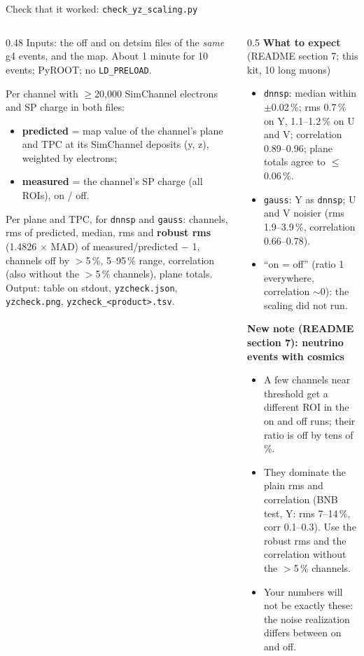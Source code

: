 \documentclass[aspectratio=169,10pt]{beamer}
\newcommand{\code}[1]{\texttt{#1}}
\begin{document}
\begin{frame}{Check that it worked: \code{check\_yz\_scaling.py}}
\footnotesize
\begin{columns}[T]
\begin{column}{0.48\textwidth}
Inputs: the off and on detsim files of the \emph{same} g4 events, and the map. About 1 minute for 10 events; PyROOT; no \code{LD\_PRELOAD}.
\vspace{1mm}

Per channel with $\ge$20,000 SimChannel electrons and SP charge in both files:
\begin{itemize}
\item \textbf{predicted} = map value of the channel's plane and TPC at its SimChannel deposits (y, z), weighted by electrons;
\item \textbf{measured} = the channel's SP charge (all ROIs), on / off.
\end{itemize}
Per plane and TPC, for \code{dnnsp} and \code{gauss}: channels, rms of predicted, median, rms and \textbf{robust rms} (1.4826 $\times$ MAD) of measured/predicted $-$ 1, channels off by $>$5\,\%, 5--95\,\% range, correlation (also without the $>$5\,\% channels), plane totals.
Output: table on stdout, \code{yzcheck.json}, \code{yzcheck.png}, \code{yzcheck\_<product>.tsv}.
\end{column}
\begin{column}{0.5\textwidth}
\textbf{What to expect} (README section 7; this kit, 10 long muons)
\begin{itemize}
\item \code{dnnsp}: median within $\pm$0.02\,\%; rms 0.7\,\% on Y, 1.1--1.2\,\% on U and V; correlation 0.89--0.96; plane totals agree to $\le$0.06\,\%.
\item \code{gauss}: Y as \code{dnnsp}; U and V noisier (rms 1.9--3.9\,\%, correlation 0.66--0.78).
\item ``on = off'' (ratio 1 everywhere, correlation $\sim$0): the scaling did not run.
\end{itemize}
\vspace{1mm}
\textbf{New note (README section 7): neutrino events with cosmics}
\begin{itemize}
\item A few channels near threshold get a different ROI in the on and off runs; their ratio is off by tens of \%.
\item They dominate the plain rms and correlation (BNB test, Y: rms 7--14\,\%, corr 0.1--0.3). Use the robust rms and the correlation without the $>$5\,\% channels.
\item Your numbers will not be exactly these: the noise realization differs between on and off.
\end{itemize}
\end{column}
\end{columns}
\end{frame}
\end{document}
